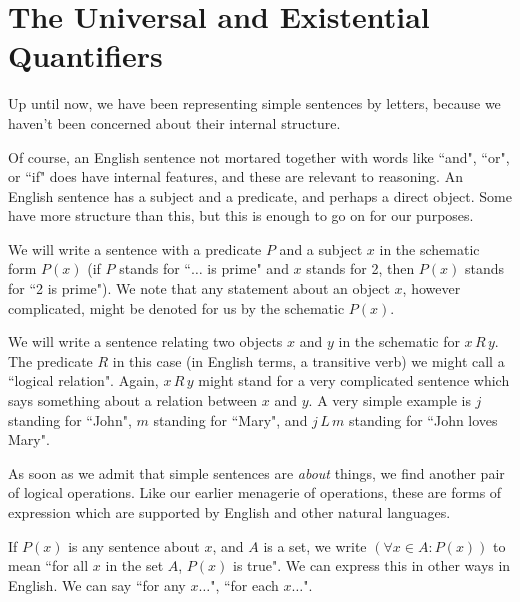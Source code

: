 \documentclass[12pt]{article}
\begin{document}
\begin{comment}
\end{array}$$

Lines 6,11,14,15,16 are the lines in which all the premises are true.  In each of these lines the conclusion is also true, so the argument is valid.

\end{enumerate}

\newpage

\end{comment}

\section{The Universal and Existential Quantifiers}

Up until now, we have been representing simple sentences by letters, because we haven't been concerned about their internal structure.

Of course, an English sentence not mortared together with words like ``and", ``or", or ``if" does have internal features, and these are relevant to reasoning.  An English sentence has a subject and a predicate, and perhaps a direct object.  Some have more structure than this, but this is enough to go on for our purposes.

We will write a sentence with a predicate $P$ and a subject $x$ in the schematic form $P(x)$ (if $P$ stands for ``$\ldots$ is prime" and $x$ stands for 2, then $P(x)$ stands for ``2 is prime").  We note that any statement about an object $x$, however complicated, might be denoted for us by the schematic $P(x)$.

We will write a sentence relating two objects $x$ and $y$ in the schematic for $x \, R \, y$.  The predicate $R$ in this case (in English terms, a transitive verb) we might call a ``logical relation".  Again, $x\,R\,y$ might stand for a very complicated sentence which says something about a relation between $x$ and $y$.  A very simple example is $j$ standing for ``John", $m$ standing for ``Mary", and $j\,L\,m$ standing for ``John loves Mary".

As soon as we admit that simple sentences are {\em about\/} things, we find another pair of logical operations.  Like our earlier menagerie of operations, these are forms of expression which are supported by English and other natural languages.

If $P(x)$ is any sentence about $x$, and $A$ is a set, we write $(\forall x \in A:P(x))$ to mean ``for all $x$ in the set $A$, $P(x)$ is true".
We can express this in other ways in English.  We can say ``for any $x\ldots$", ``for each $x\ldots$".
\end{document}

